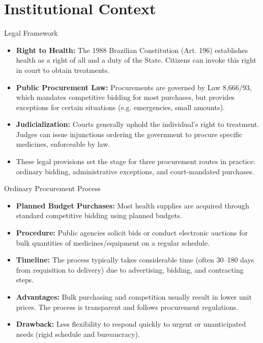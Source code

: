 \documentclass{beamer}
\begin{document}
\section{Institutional Context}

\begin{frame}{Legal Framework}
\begin{itemize}
  \item \textbf{Right to Health:} The 1988 Brazilian Constitution (Art. 196) establishes health as a right of all and a duty of the State. Citizens can invoke this right in court to obtain treatments.
  \item \textbf{Public Procurement Law:} Procurements are governed by Law 8,666/93, which mandates competitive bidding for most purchases, but provides exceptions for certain situations (e.g. emergencies, small amounts).
  \item \textbf{Judicialization:} Courts generally uphold the individual's right to treatment. Judges can issue injunctions ordering the government to procure specific medicines, enforceable by law.
  \item These legal provisions set the stage for three procurement routes in practice: ordinary bidding, administrative exceptions, and court-mandated purchases.
\end{itemize}
\end{frame}

\begin{frame}{Ordinary Procurement Process}
\begin{itemize}
  \item \textbf{Planned Budget Purchases:} Most health supplies are acquired through standard competitive bidding using planned budgets.
  \item \textbf{Procedure:} Public agencies solicit bids or conduct electronic auctions for bulk quantities of medicines/equipment on a regular schedule.
  \item \textbf{Timeline:} The process typically takes considerable time (often 30--180 days from requisition to delivery) due to advertising, bidding, and contracting steps.
  \item \textbf{Advantages:} Bulk purchasing and competition usually result in lower unit prices. The process is transparent and follows procurement regulations.
  \item \textbf{Drawback:} Less flexibility to respond quickly to urgent or unanticipated needs (rigid schedule and bureaucracy).
\end{itemize}
\end{frame}
\end{document}

